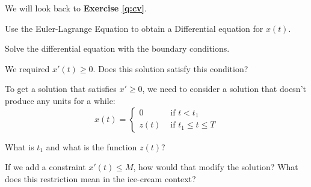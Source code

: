 \documentclass{workbook}
\begin{document}
\begin{slide}
	

\question

We will look back to \textbf{Exercise \ref{q:cv}}.

\begin{parts}
	\item Use the Euler-Lagrange Equation to obtain a Differential equation for $x(t)$.
		
	\item Solve the differential equation with the boundary conditions.
		
	\item We required $x'(t) \geq 0$. Does this solution satisfy this condition?
	
	\item To get a solution that satisfies $x'\geq 0$, we need to consider a solution that doesn't produce any units for a while: 
	\[ x(t) = \begin{cases}
 			0 & \text{ if } t < t_1 \\
 			z(t) & \text{ if } t_1 \leq t \leq T
	 \end{cases}
	 \]
	 
	 What is $t_1$ and what is the function $z(t)$?	
	
	\item If we add a constraint $x'(t) \leq M$, how would that modify the solution? What does this restriction mean in the ice-cream context?
	
\end{parts}
\end{slide}
\end{document}
